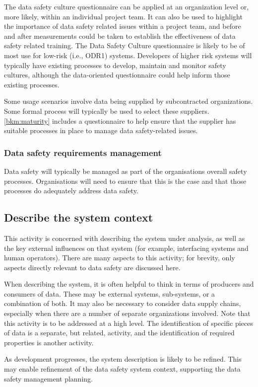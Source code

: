 The data safety culture questionnaire can be applied at an organization level or, more likely, within an individual project team. It can also be used to highlight the importance of data safety related issues within a project team, and before and after measurements could be taken to establish the effectiveness of data safety related training.
The Data Safety Culture questionnaire is likely to be of most use for low-risk (i.e., ODR1) systems. Developers of higher risk systems will typically have existing processes to develop, maintain and monitor safety cultures, although the data-oriented questionnaire could help inform those existing processes.

Some usage scenarios involve data being supplied by subcontracted organizations. Some formal process will typically be used to select these suppliers. \autoref{bkm:maturity} includes a questionnaire to help ensure that the supplier has suitable processes in place to manage data safety-related issues.
\subsubsection{Data safety requirements management}
Data safety will typically be managed as part of the organisations overall safety processes. Organisations will need to ensure that this is the case and that those processes do adequately address data safety.
\subsection{Describe the system context}
This activity is concerned with describing the system under analysis, as well as the key external influences on that system (for example, interfacing systems and human operators). There are many aspects to this activity; for brevity, only aspects directly relevant to data safety are discussed here.

When describing the system, it is often helpful to think in terms of producers and consumers of data. These may be external systems, sub-systems, or a combination of both. It may also be necessary to consider data supply chains, especially when there are a number of separate organizations involved. Note that this activity is to be addressed at a high level. The identification of specific pieces of data is a separate, but related, activity, and the identification of required properties is another activity.

As development progresses, the system description is likely to be refined. This may enable refinement of the data safety system context, supporting the data safety management planning.

